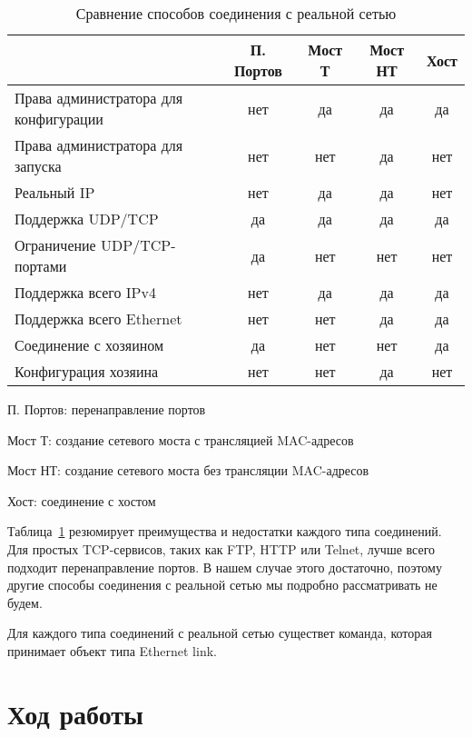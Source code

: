 \begin{table}[htb]
    \caption{Сравнение способов соединения с реальной сетью}
    \label{tab:cmp-real-network-connection}
    \center
    \begin{tabularx}{\textwidth}{|X|c|c|c|c|}
    \hline
        &   П. Портов   &   Мост Т  &   Мост НТ &   Хост \\
    \hline
    Права администратора для конфигурации   & нет   & да    & да    & да \\
    Права администратора для запуска    & нет   & нет   & да    & нет \\
    Реальный IP & нет   & да    & да    & нет \\
    Поддержка UDP/TCP   & да    & да    & да    & да \\
    Ограничение UDP/TCP-портами & да    & нет   & нет   & нет \\
    Поддержка всего IPv4    & нет   & да    & да    & да \\
    Поддержка всего Ethernet    & нет   & нет   & да    & да \\
    Соединение с хозяином   & да    & нет   & нет   & да \\
    Конфигурация хозяина    & нет   & нет   & да    & нет \\
    \hline
    \end{tabularx}

\begin{description*}
    \item[П. Портов:] перенаправление портов
    \item[Мост Т:] создание сетевого моста с трансляцией MAC-адресов
    \item[Мост НТ:] создание сетевого моста без трансляции MAC-адресов
    \item[Хост:] соединение с хостом
\end{description*}

\end{table}

Таблица~\ref{tab:cmp-real-network-connection} резюмирует преимущества и недостатки каждого типа соединений. Для простых TCP-сервисов, таких как FTP, HTTP или Telnet, лучше всего подходит перенаправление портов. В нашем случае этого достаточно, поэтому другие способы соединения с реальной сетью мы подробно рассматривать не будем.

Для каждого типа соединений с реальной сетью существет команда, которая принимает объект типа Ethernet link.

\section{Ход работы}

